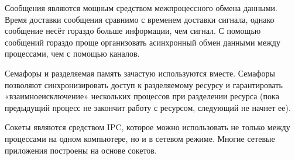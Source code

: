 \documentclass[a4paper]{article}
\begin{document}
	Сообщения являются мощным средством межпроцессного обмена данными. Время доставки сообщения сравнимо с временем доставки сигнала, однако сообщение несёт гораздо больше информации, чем сигнал. С помощью сообщений гораздо проще организовать асинхронный обмен данными между процессами, чем с помощью каналов.
	
	Семафоры и разделяемая память зачастую используются вместе. Семафоры позволяют синхронизировать доступ к разделяемому ресурсу и гарантировать «взаимноеисключение» нескольких процессов при разделении ресурса (пока предыдущий процесс не закончит работу с ресурсом, следующий не начнет ее).
	
	Сокеты являются средством IPC, которое можно использовать не только между процессами на одном компьютере, но и в сетевом режиме. Многие сетевые приложения построены на основе сокетов.
\end{document}
